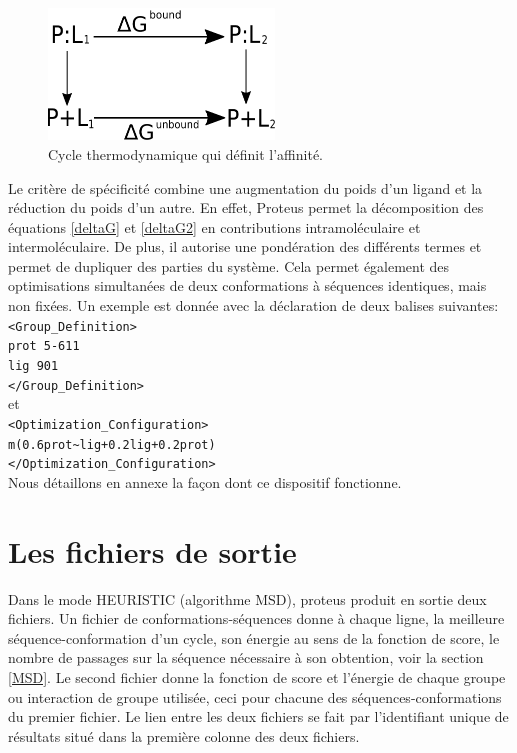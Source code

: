    \begin{figure}[!htbp]
     \centering
       \includegraphics[width=6cm]{figure/cycleThermoLigand.pdf} 
     \caption{Cycle thermodynamique qui définit l'affinité.}
\label{fig:cycleThermoLigand}
   \end{figure}
Le critère de spécificité combine une augmentation du poids d'un ligand et la réduction du poids d'un autre. En effet, Proteus permet la décomposition des équations \ref{deltaG} et \ref{deltaG2} en contributions intramoléculaire et intermoléculaire. De plus, il autorise une pondération des différents termes et permet de dupliquer des parties du système. Cela permet également des optimisations simultanées de deux conformations à séquences identiques, mais non fixées. Un exemple est donnée avec la déclaration de deux balises suivantes:\\
\verb!<Group_Definition>!\\
\verb!prot 5-611!\\
\verb!lig 901!\\
\verb!</Group_Definition>!\\
et\\
\verb!<Optimization_Configuration>!\\
\verb!m(0.6prot~lig+0.2lig+0.2prot)!\\
\verb!</Optimization_Configuration>!\\
Nous détaillons en annexe la façon dont ce dispositif fonctionne.

\section{Les fichiers de sortie}
\label{proteusIO}
Dans le mode HEURISTIC (algorithme MSD), proteus produit en sortie deux fichiers. Un fichier de conformations-séquences donne à chaque ligne, la meilleure séquence-conformation d'un cycle, son énergie au sens de la fonction de score, le nombre de passages sur la séquence nécessaire à son obtention, voir la section \vref{MSD}. Le second fichier donne la fonction de score et l'énergie de chaque groupe ou interaction de groupe utilisée, ceci pour chacune des séquences-conformations du premier fichier. Le lien entre les deux fichiers se fait par l'identifiant unique de résultats situé dans la première colonne des deux fichiers.

